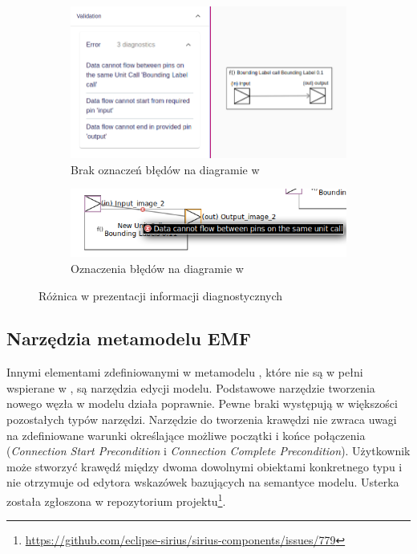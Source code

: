 \begin{figure}
	\centering
	\begin{subfigure}{.49\textwidth}
		\centering
		\includegraphics[width=.99\linewidth]{./images/sirius-web-semantic-validation-direction-and-no-loops-rules.png}
		\caption{Brak oznaczeń błędów na diagramie w \SiriusWeb{}}\label{rys:validation-comparison-sirius-web}
	\end{subfigure}
  \begin{subfigure}{.49\textwidth}
		\centering
		\includegraphics[width=.99\linewidth]{./images/sirius-desktop-example-semantic-validation-rule-failure.png}
		\caption{Oznaczenia błędów na diagramie w \SiriusDesktop{}}\label{rys:validation-comparison-sirius-desktop}
	\end{subfigure}

	\caption{Różnica w prezentacji informacji diagnostycznych}
\end{figure}

\subsection{Narzędzia metamodelu EMF}

Innymi elementami zdefiniowanymi w metamodelu \EMF{}, które nie są w pełni
wspierane w \SiriusWeb{}, są narzędzia edycji modelu. Podstawowe narzędzie
tworzenia nowego węzła w modelu działa poprawnie.
Pewne braki występują w większości pozostałych typów narzędzi. Narzędzie do
tworzenia krawędzi nie zwraca uwagi na zdefiniowane warunki określające możliwe
początki i końce połączenia (\emph{Connection Start Precondition} i
\emph{Connection Complete Precondition}). Użytkownik może stworzyć krawędź
między dwoma dowolnymi obiektami konkretnego typu i nie otrzymuje od edytora
wskazówek bazujących na semantyce modelu. Usterka została zgłoszona w
repozytorium projektu\footnote{
	\url{https://github.com/eclipse-sirius/sirius-components/issues/779}}.

